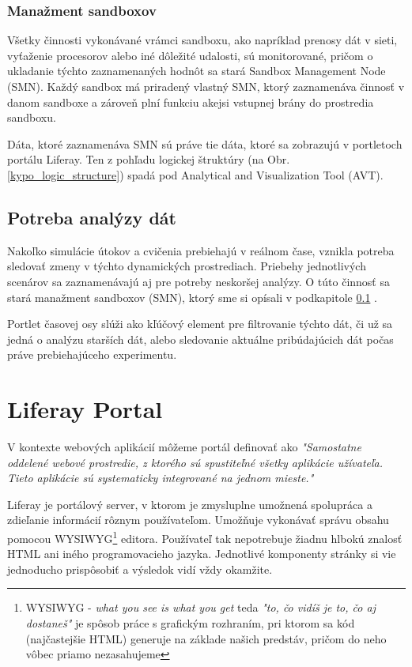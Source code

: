 \documentclass[
  digital, %
  twoside, %
  notable,   %
  nolof,   %
  nolot,   %
]{fithesis3}
\begin{document}
\subsection{Manažment sandboxov}
\label{smn}
Všetky činnosti vykonávané vrámci sandboxu, ako napríklad prenosy dát v sieti, vyťaženie procesorov alebo iné dôležité udalosti, sú monitorované, pričom o ukladanie týchto zaznamenaných hodnôt sa stará Sandbox Management Node (SMN). Každý sandbox má priradený vlastný SMN, ktorý zaznamenáva činnosť v danom sandboxe a zároveň plní funkciu akejsi vstupnej brány do prostredia sandboxu\cite{eichler2014analytical}.

Dáta, ktoré zaznamenáva SMN sú práve tie dáta, ktoré sa zobrazujú v portletoch portálu Liferay. Ten z pohľadu logickej štruktúry (na Obr. \ref{kypo_logic_structure}) spadá pod Analytical and Visualization Tool (AVT).

\section{Potreba analýzy dát}
Nakoľko simulácie útokov a cvičenia prebiehajú v reálnom čase, vznikla potreba sledovať zmeny v týchto dynamických prostrediach. Priebehy jednotlivých scenárov sa zaznamenávajú aj pre potreby neskoršej analýzy. O túto činnosť sa stará manažment sandboxov (SMN), ktorý sme si opísali v podkapitole \ref{smn} .

Portlet časovej osy slúži ako kľúčový element pre filtrovanie týchto dát, či už sa jedná o analýzu starších dát, alebo sledovanie aktuálne pribúdajúcich dát počas práve prebiehajúceho experimentu.

\chapter{Liferay Portal}
\label{liferay}
V kontexte webových aplikácií môžeme portál definovať\cite{sezov2011liferay} ako \textit{"Samostatne oddelené webové prostredie, z ktorého sú spustiteľné všetky aplikácie užívateľa. Tieto aplikácie sú systematicky integrované na jednom mieste."}

Liferay je portálový server, v ktorom je zmysluplne umožnená spolupráca a zdieľanie informácií rôznym používateľom. Umožňuje vykonávať správu obsahu pomocou WYSIWYG\footnote{WYSIWYG - \textit{what you see is what you get} teda \textit{"to, čo vidíš je to, čo aj dostaneš"} je spôsob práce s grafickým rozhraním, pri ktorom sa kód (najčastejšie HTML) generuje na základe našich predstáv, pričom do neho vôbec priamo nezasahujeme} editora. Používateľ tak nepotrebuje žiadnu hlbokú znalosť HTML ani iného programovacieho jazyka. Jednotlivé komponenty stránky si vie jednoducho prispôsobiť a výsledok vidí vždy okamžite\cite{sezov2011liferay}.
\end{document}
